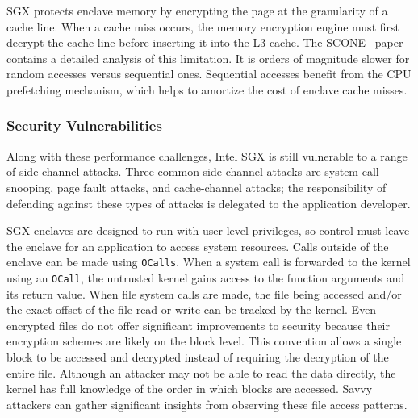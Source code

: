 \documentclass[letterpaper,twocolumn,10pt]{article}
\begin{document}
SGX protects enclave memory by encrypting the page at the granularity of a
cache line. When a cache miss occurs, the memory encryption engine must first
decrypt the cache line before inserting it into the L3 cache. The SCONE~\cite{arnautov_scone:_2016}
paper contains a detailed analysis of this limitation. It is orders of
magnitude slower for random accesses versus sequential ones. Sequential
accesses benefit from the CPU prefetching mechanism, which helps to amortize
the cost of enclave cache misses. 


\subsubsection{Security Vulnerabilities}
Along with these performance challenges, Intel SGX is still vulnerable to a
range of side-channel attacks. Three common side-channel attacks are system
call snooping, page fault attacks, and cache-channel attacks; the
responsibility of defending against these types of attacks is delegated to the
application developer.


SGX enclaves are designed to run with user-level privileges, so control must 
leave the enclave for an application to access system resources. 
Calls outside of the enclave can be made using \verb|OCalls|. 
When a system call is forwarded to the kernel using an \verb|OCall|, the 
untrusted kernel gains access to the function arguments and its return value. 
When file system calls are made, the file being accessed and/or the 
exact offset of the file read or write can be tracked by the kernel. Even 
encrypted files do not offer significant improvements to security because 
their encryption schemes are likely on the block level. This convention allows 
a single block to be accessed and decrypted instead of requiring the decryption 
of the entire file. Although an attacker may not be able to read the data 
directly, the kernel has full knowledge of the order in which blocks are 
accessed. Savvy attackers can gather significant insights from observing these 
file access patterns. 


\end{document}
